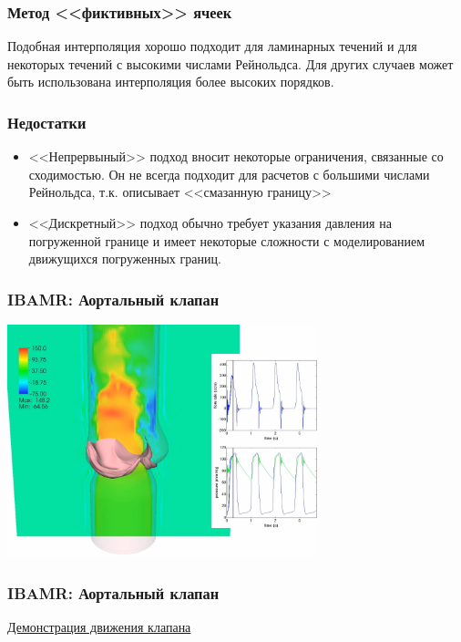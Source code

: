 \documentclass[14pt]{beamer}
\begin{document}
\begin{frame}
\frametitle{Метод <<фиктивных>> ячеек}
Подобная интерполяция хорошо подходит для ламинарных течений и для некоторых течений с высокими числами Рейнольдса.
Для других случаев может быть использована интерполяция более высоких порядков. 
\end{frame}

\begin{frame}
\frametitle{Недостатки}
    \begin{itemize}
        \item \alert<+>{<<Непрервыный>> подход вносит некоторые ограничения, связанные со сходимостью. Он не всегда подходит для расчетов с большими числами Рейнольдса, т.к. описывает <<смазанную границу>>
}
        \item \alert<+>{<<Дискретный>> подход обычно требует указания давления на погруженной границе и имеет некоторые сложности с моделированием движущихся погруженных границ.}
    \end{itemize}
\end{frame}

\begin{frame}
\frametitle{IBAMR: Аортальный клапан}
    \begin{center}
	\includegraphics[width=9cm]{immersed_boundary/shot0002.png}
    \end{center}
\end{frame}

\begin{frame}
\frametitle{IBAMR: Аортальный клапан}
    \begin{center}
        \href{run:video/valve\_top.mov}{Демонстрация движения клапана}
    \end{center}
\end{frame}
\end{document}
